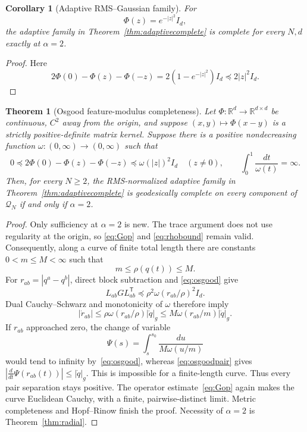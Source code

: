 \documentclass[11pt]{article}
\newtheorem{theorem}{Theorem}
\newtheorem{corollary}{Corollary}
\newcommand{\R}{\mathbb{R}}
\newcommand{\Q}{\mathcal{Q}}
\begin{document}
\begin{corollary}[Adaptive RMS--Gaussian family]
For
\[
 \Phi(z)=e^{-|z|^2}I_d,
\]
the adaptive family in Theorem~\ref{thm:adaptivecomplete} is complete for
every \(N,d\) exactly at \(\alpha=2\).
\end{corollary}

\begin{proof}
Here
\[
 2\Phi(0)-\Phi(z)-\Phi(-z)
 =2(1-e^{-|z|^2})I_d\preccurlyeq2|z|^2I_d.
\]
\end{proof}

\begin{theorem}[Osgood feature-modulus completeness]
\label{thm:osgood}
Let \(\Phi:\R^d\to\R^{d\times d}\) be continuous, \(C^2\) away from
the origin, and suppose \((x,y)\mapsto\Phi(x-y)\) is a strictly
positive-definite matrix kernel.  Suppose there is a positive
nondecreasing function \(\omega:(0,\infty)\to(0,\infty)\) such that
\begin{equation}
 0\preccurlyeq
 2\Phi(0)-\Phi(z)-\Phi(-z)
 \preccurlyeq \omega(|z|)^2I_d
 \quad(z\ne0),
 \qquad
 \int_0^1\frac{dt}{\omega(t)}=\infty.
 \label{eq:osgood}
\end{equation}
Then, for every \(N\ge2\), the RMS-normalized adaptive family in
Theorem~\ref{thm:adaptivecomplete} is geodesically complete on every
component of \(\Q_N\) if and only if \(\alpha=2\).
\end{theorem}

\begin{proof}
Only sufficiency at \(\alpha=2\) is new.  The trace argument does not use
regularity at the origin, so \eqref{eq:Gop} and \eqref{eq:rhobound} remain
valid.  Consequently, along a curve of finite total length there are
constants \(0<m\le M<\infty\) such that
\[
 m\le\rho(q(t))\le M.
\]
For \(r_{ab}=|q^a-q^b|\), direct block subtraction and
\eqref{eq:osgood} give
\[
 L_{ab}GL_{ab}^{\mathsf T}
 \preccurlyeq
 \rho^2\omega(r_{ab}/\rho)^2I_d.
\]
Dual Cauchy--Schwarz and monotonicity of \(\omega\) therefore imply
\begin{equation}
 |\dot r_{ab}|
 \le \rho\omega(r_{ab}/\rho)|\dot q|_g
 \le M\omega(r_{ab}/m)|\dot q|_g.
 \label{eq:osgoodpair}
\end{equation}
If \(r_{ab}\) approached zero, the change of variable
\[
 \Psi(s)=\int_s^{s_0}\frac{du}{M\omega(u/m)}
\]
would tend to infinity by~\eqref{eq:osgood}, whereas
\eqref{eq:osgoodpair} gives
\(|\frac d{dt}\Psi(r_{ab}(t))|\le|\dot q|_g\).  This is impossible
for a finite-length curve.  Thus every pair separation stays positive.
The operator estimate~\eqref{eq:Gop} again makes the curve Euclidean
Cauchy, with a finite, pairwise-distinct limit.  Metric completeness and
Hopf--Rinow finish the proof.  Necessity of \(\alpha=2\) is
Theorem~\ref{thm:radial}.
\end{proof}
\end{document}
